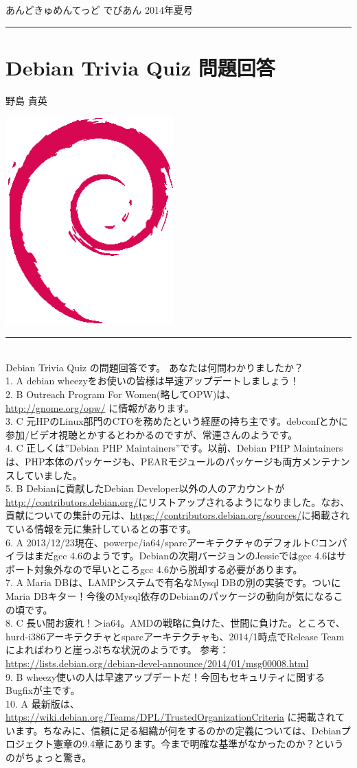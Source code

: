 \documentclass[mingoth,a4paper]{jsarticle}
\renewcommand{\dancersection}[2]{%
\newpage
あんどきゅめんてっど でびあん 2014年夏号
%
\vspace{0.1mm}\\
{\color{dancerdarkblue}\rule{\hsize}{2mm}}

%
%
\begin{minipage}[t]{0.6\hsize}
\color{dancerdarkblue}
\vspace{1cm}
\section{#1}
\hfill{}#2\\
\end{minipage}
\begin{minipage}[t]{0.4\hsize}
\vspace{-2cm}
\hfill{}\includegraphics[height=8cm]{image200502/openlogo-nd.eps}\\
\vspace{-5cm}
\end{minipage}
%
{\color{dancerlightblue}\rule{0.66\hsize}{2mm}}
%
\vspace{2cm}
}
\begin{document}
\dancersection{Debian Trivia Quiz 問題回答}{野島 貴英}
\\
{\small
 Debian Trivia Quiz の問題回答です。 あなたは何問わかりましたか？ \\
1. A debian wheezyをお使いの皆様は早速アップデートしましょう！\\
2. B Outreach Program For Women(略してOPW)は、\\ \url {http://gnome.org/opw/} に情報があります。\\
3. C 元HPのLinux部門のCTOを務めたという経歴の持ち主です。debconfとかに参加/ビデオ視聴とかするとわかるのですが、常連さんのようです。\\
4. C 正しくは''Debian PHP Maintainers''です。以前、Debian PHP Maintainersは、PHP本体のパッケージも、PEARモジュールのパッケージも両方メンテナンスしていました。\\
5. B Debianに貢献したDebian Developer以外の人のアカウントが\url {http://contributors.debian.org/}にリストアップされるようになりました。なお、貢献についての集計の元は、\url {https://contributors.debian.org/sources/}に掲載されている情報を元に集計しているとの事です。\\
6. A 2013/12/23現在、powerpc/ia64/sparcアーキテクチャのデフォルトCコンパイラはまだgcc 4.6のようです。Debianの次期バージョンのJessieではgcc 4.6はサポート対象外なので早いところgcc 4.6から脱却する必要があります。\\
7. A Maria DBは、LAMPシステムで有名なMysql DBの別の実装です。ついにMaria DBキター！今後のMysql依存のDebianのパッケージの動向が気になるこの頃です。\\
8. C 長い間お疲れ！＞ia64。AMDの戦略に負けた、世間に負けた。ところで、hurd-i386アーキテクチャとsparcアーキテクチャも、2014/1時点でRelease Teamによればわりと崖っぷちな状況のようです。 参考：\url{https://lists.debian.org/debian-devel-announce/2014/01/msg00008.html} \\
9. B wheezy使いの人は早速アップデートだ！今回もセキュリティに関するBugfixが主です。\\
10. A 最新版は、\url {https://wiki.debian.org/Teams/DPL/TrustedOrganizationCriteria} に掲載されています。ちなみに、信頼に足る組織が何をするのかの定義については、Debianプロジェクト憲章の9.4章にあります。今まで明確な基準がなかったのか？というのがちょっと驚き。\\
}
\end{document}
